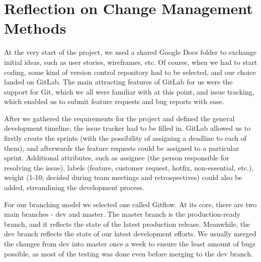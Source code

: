 \documentclass{l3proj}
\begin{document}
\newpage
\section{Reflection on Change Management Methods}
\label{sec:changemgmt}

At the very start of the project, we used a shared Google Docs folder to exchange initial ideas, such as user stories, wireframes, etc. Of course, when we had to start coding, some kind of version control repository had to be selected, and our choice landed on GitLab. The main attracting features of GitLab for us were the support for Git, which we all were familiar with at this point, and issue tracking, which enabled us to submit feature requests and bug reports with ease.

After we gathered the requirements for the project and defined the general development timeline, the issue tracker had to be filled in. GitLab allowed us to firstly create the sprints (with the possibility of assigning a deadline to each of them), and afterwards the feature requests could be assigned to a particular sprint. Additional attributes, such as assignee (the person responsible for resolving the issue), labels (feature, customer request, hotfix, non-essential, etc.), weight (1-10; decided during team meetings and retrospectives) could also be added, streamlining the development process.

For our branching model we selected one called Gitflow. \cite{gitflow} At its core, there are two main branches - dev and master. The master branch is the production-ready branch, and it reflects the state of the latest production release. Meanwhile, the dev branch reflects the state of our latest development efforts. We usually merged the changes from dev into master once a week to ensure the least amount of bugs possible, as most of the testing was done even before merging to the dev branch.


\end{document}
